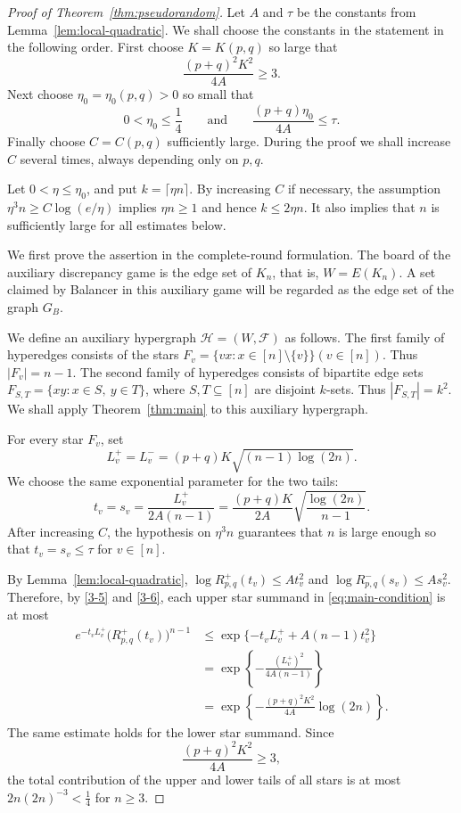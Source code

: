 \documentclass[10pt,a4paper]{amsart}
\begin{document}
\begin{proof}[Proof of Theorem~\ref{thm:pseudorandom}]
Let $A$ and $\tau$ be the constants from Lemma~\ref{lem:local-quadratic}.
We shall choose the constants in the statement in the following order.  First choose
$K=K(p,q)$ so large that
\[
        \frac{(p+q)^2K^2}{4A}\ge 3.
\]
Next choose $\eta_0=\eta_0(p,q)>0$ so small that
\[
        0<\eta_0\le \frac14
        \qquad\text{and}\qquad
        \frac{(p+q)\eta_0}{4A}\le \tau.
\]
Finally choose $C=C(p,q)$ sufficiently large.  During the proof we shall increase
$C$ several times, always depending only on $p,q$.

Let $0<\eta\le\eta_0$, and put
        $k=\lceil \eta n\rceil$.
By increasing $C$ if necessary, the assumption
$\eta^3 n\ge C\log(e/\eta)$
implies
        $\eta n\ge1$
        and hence 
        $k\le 2\eta n$.
It also implies that $n$ is sufficiently large for all estimates below.

We first prove the assertion in the complete-round formulation.  The board of the
auxiliary discrepancy game is the edge set of $K_n$, that is, $W=E(K_n)$.
A set claimed by Balancer in this auxiliary game will be regarded as the edge set
of the graph $G_B$.

We define an auxiliary hypergraph
$\mathcal H=(W,\mathcal F)$
as follows.  The first family of hyperedges consists of the stars
$F_v=\{vx:x\in[n]\setminus\{v\}\}
  (v\in[n])$.
Thus
        $|F_v|=n-1$.
The second family of hyperedges consists of bipartite edge sets
$F_{S,T}=\{xy:x\in S,\ y\in T\}$,
where $S,T\subseteq[n]$ are disjoint $k$-sets. Thus
        $|F_{S,T}|=k^2$.
We shall apply Theorem~\ref{thm:main} to this auxiliary hypergraph.

For every star $F_v$, set
\begin{equation}\label{3-5}
L_v^+=L_v^-=(p+q)K\sqrt{(n-1)\log(2n)}.
\end{equation}
We choose the same exponential parameter for the two tails:
\begin{equation}\label{3-6}
t_v=s_v=
        \frac{L_v^+}{2A(n-1)}
        =
        \frac{(p+q)K}{2A}
        \sqrt{\frac{\log(2n)}{n-1}}.
\end{equation}
After increasing $C$, the hypothesis on $\eta^3 n$ guarantees that
$n$ is large enough so that
$t_v=s_v\le\tau$
for $v\in[n]$.

By Lemma~\ref{lem:local-quadratic},
$\log R^+_{p,q}(t_v)\le A t_v^2$ and $\log R^-_{p,q}(s_v)\le A s_v^2$. 
Therefore, by \eqref{3-5} and \eqref{3-6}, each upper star summand in \eqref{eq:main-condition} is at most
\[
\begin{aligned}
        e^{-t_vL_v^+}
        \bigl(R^+_{p,q}(t_v)\bigr)^{n-1}
        &\le
        \exp\{-t_vL_v^+ + A(n-1)t_v^2\}  \\
        &=
        \exp\left\{
        -\frac{(L_v^+)^2}{4A(n-1)}
        \right\}  \\
        &=
        \exp\left\{
        -\frac{(p+q)^2K^2}{4A}\log(2n)
        \right\}.
\end{aligned}
\]
The same estimate holds for the lower star summand.  Since
\[
        \frac{(p+q)^2K^2}{4A}\ge3,
\]
the total contribution of the upper and lower tails of all stars is at most
$2n(2n)^{-3}<\frac14$
for $n\ge3$.



\end{proof}
\end{document}
